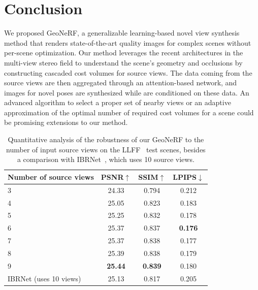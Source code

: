 \section{Conclusion}
We proposed GeoNeRF, a generalizable learning-based novel view synthesis method that renders state-of-the-art quality images for complex scenes without per-scene optimization. Our method leverages the recent architectures in the multi-view stereo field to understand the scene's geometry and occlusions by constructing cascaded cost volumes for source views. The data coming from the source views are then aggregated through an attention-based network, and images for novel poses are synthesized while are conditioned on these data. An advanced algorithm to select a proper set of nearby views or an adaptive approximation of the optimal number of required cost volumes for a scene could be promising extensions to our method.

\begin{table}[!t]
\begin{center}
        \begin{tabular}{l|ccc}
        \hline
        Number of source views & PSNR$\uparrow$ & SSIM$\uparrow$ & LPIPS$\downarrow$  \\
        \hline
        3 & 24.33 & 0.794 & 0.212  \\
        4 & 25.05 & 0.823 & 0.183  \\
        5 & 25.25 & 0.832 & 0.178  \\
        6  & 25.37 & 0.837 & \textbf{0.176} \\
        7 & 25.37 & 0.838 & 0.177  \\
        8 & 25.39 & 0.838 & 0.179  \\
        9 & \textbf{25.44} & \textbf{0.839} & 0.180  \\
        \hline
        IBRNet (uses 10 views) & 25.13 & 0.817 & 0.205  \\
        \hline
        \end{tabular}
    \end{center}
    \caption{Quantitative analysis of the robustness of our GeoNeRF to the number of input source views on the LLFF~\citep{mildenhall2019llff} test scenes, besides a comparison with IBRNet~\citep{wang2021ibrnet}, which uses 10 source views.}
    \label{table:n_views}
\end{table}

